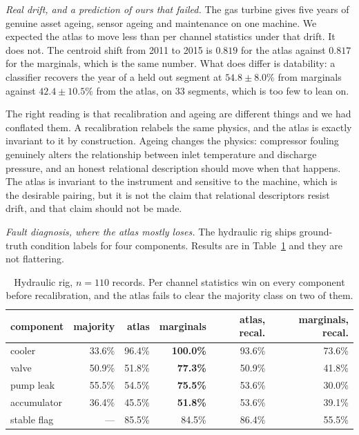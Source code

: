 \documentclass[11pt]{article}
\begin{document}
\emph{Real drift, and a prediction of ours that failed.} The gas turbine gives
five years of genuine asset ageing, sensor ageing and maintenance on one
machine. We expected the atlas to move less than per channel statistics under
that drift. It does not. The centroid shift from 2011 to 2015 is $0.819$ for the
atlas against $0.817$ for the marginals, which is the same number. What does
differ is datability: a classifier recovers the year of a held out segment at
$54.8\pm8.0\%$ from marginals against $42.4\pm10.5\%$ from the atlas, on 33
segments, which is too few to lean on.

The right reading is that recalibration and ageing are different things and we
had conflated them. A recalibration relabels the same physics, and the atlas is
exactly invariant to it by construction. Ageing changes the physics: compressor
fouling genuinely alters the relationship between inlet temperature and
discharge pressure, and an honest relational description should move when that
happens. The atlas is invariant to the instrument and sensitive to the machine,
which is the desirable pairing, but it is not the claim that relational
descriptors resist drift, and that claim should not be made.

\emph{Fault diagnosis, where the atlas mostly loses.} The hydraulic rig ships
ground-truth condition labels for four components. Results are in
Table~\ref{tab:fault} and they are not flattering.

\begin{table}[t]
\centering
\begin{tabular}{lrrrrr}
\toprule
component & majority & atlas & marginals & atlas, recal. & marginals, recal. \\
\midrule
cooler       & 33.6\% & 96.4\% & \textbf{100.0\%} & 93.6\% & 73.6\% \\
valve        & 50.9\% & 51.8\% & \textbf{77.3\%}  & 50.9\% & 41.8\% \\
pump leak    & 55.5\% & 54.5\% & \textbf{75.5\%}  & 53.6\% & 30.0\% \\
accumulator  & 36.4\% & 45.5\% & \textbf{51.8\%}  & 53.6\% & 39.1\% \\
stable flag  & ---    & 85.5\% & 84.5\%           & 86.4\% & 55.5\% \\
\bottomrule
\end{tabular}
\caption{Hydraulic rig, $n=110$ records. Per channel statistics win on every
component before recalibration, and the atlas fails to clear the majority class
on two of them.}
\label{tab:fault}
\end{table}
\end{document}
